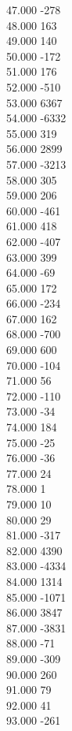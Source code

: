 { 47.000	-278 \\
 48.000	163 \\
 49.000	140 \\
 50.000	-172 \\
 51.000	176 \\
 52.000	-510 \\
 53.000	6367 \\
 54.000	-6332 \\
 55.000	319 \\
 56.000	2899 \\
 57.000	-3213 \\
 58.000	305 \\
 59.000	206 \\
 60.000	-461 \\
 61.000	418 \\
 62.000	-407 \\
 63.000	399 \\
 64.000	-69 \\
 65.000	172 \\
 66.000	-234 \\
 67.000	162 \\
 68.000	-700 \\
 69.000	600 \\
 70.000	-104 \\
 71.000	56 \\
 72.000	-110 \\
 73.000	-34 \\
 74.000	184 \\
 75.000	-25 \\
 76.000	-36 \\
 77.000	24 \\
 78.000	1 \\
 79.000	10 \\
 80.000	29 \\
 81.000	-317 \\
 82.000	4390 \\
 83.000	-4334 \\
 84.000	1314 \\
 85.000	-1071 \\
 86.000	3847 \\
 87.000	-3831 \\
 88.000	-71 \\
 89.000	-309 \\
 90.000	260 \\
 91.000	79 \\
 92.000	41 \\
 93.000	-261 \\
}
